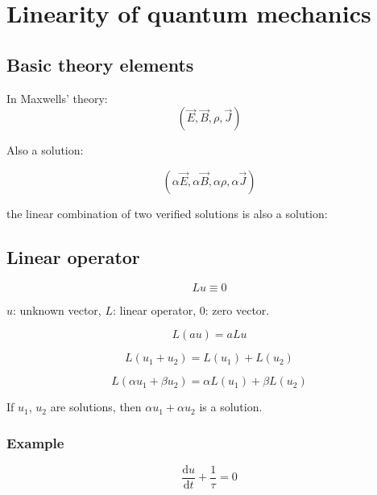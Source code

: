 \documentclass[a4paper]{article}
\renewcommand{\d}{\mathrm{d}}
\begin{document}
    \section{Linearity of quantum mechanics}
    \subsection{Basic theory elements}
    In Maxwells' theory:
    \begin{equation*}
        \left( \vec{E}, \vec{B}, \rho, \vec{J} \right)
    \end{equation*}

    Also a solution:
    
    \begin{equation*}
        \left( \alpha\vec{E}, \alpha\vec{B}, \alpha\rho, \alpha\vec{J} \right)
    \end{equation*}

    the linear combination of two verified solutions is also a solution:
    
    \subsection{Linear operator}

    \begin{equation*}
        L u \equiv 0
    \end{equation*}

    $u$: unknown vector, $L$: linear operator, $0$: zero vector.


    \begin{equation*}
        L(au) = aLu
    \end{equation*}

    \begin{equation*}
        L(u_1 + u_2) = L(u_1) + L(u_2)
    \end{equation*}

    \begin{equation*}
        L(\alpha u_1 + \beta u_2) = \alpha L(u_1) + \beta L(u_2)
    \end{equation*}


    If $u_1$, $u_2$ are solutions, then $\alpha u_1 + \alpha u_2$ is a solution.
    

    \subsubsection{Example}

    \begin{equation*}
        \frac{\d u}{\d t} + \frac{1}{\tau} = 0
    \end{equation*}
    
\end{document}
